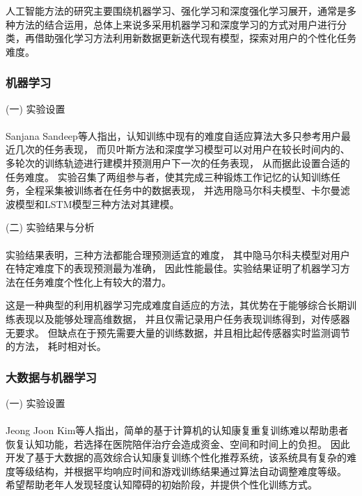 \documentclass[12pt]{article}
\begin{document}
        人工智能方法的研究主要围绕机器学习、强化学习和深度强化学习展开，通常是多种方法的结合运用，总体上来说多采用机器学习和深度学习的方式对用户进行分类，再借助强化学习方法利用新数据更新迭代现有模型，探索对用户的个性化任务难度。
        \subsubsection{机器学习}
            (一) 实验设置\paragraph{}
            Sanjana Sandeep\cite{ref12}等人指出，认知训练中现有的难度自适应算法大多只参考用户最近几次的任务表现，
            而贝叶斯方法和深度学习模型可以对用户在较长时间内的、多轮次的训练轨迹进行建模并预测用户下一次的任务表现，
            从而据此设置合适的任务难度。
            实验召集了两组参与者，使其完成三种锻炼工作记忆的认知训练任务，全程采集被训练者在任务中的数据表现，
            并选用隐马尔科夫模型、卡尔曼滤波模型和LSTM模型三种方法对其建模。

            (二) 实验结果与分析\paragraph{}
            实验结果表明，三种方法都能合理预测适宜的难度，
            其中隐马尔科夫模型对用户在特定难度下的表现预测最为准确，
            因此性能最佳。实验结果证明了机器学习方法在任务难度个性化上有较大的潜力。

            这是一种典型的利用机器学习完成难度自适应的方法，其优势在于能够综合长期训练表现以及能够处理高维数据，
            并且仅需记录用户任务表现训练得到，对传感器无要求。
            但缺点在于预先需要大量的训练数据，并且相比起传感器实时监测调节的方法，
            耗时相对长。

            \subsubsection{大数据与机器学习}
            (一) 实验设置\paragraph{}
            Jeong Joon Kim\cite{ref13}等人指出，简单的基于计算机的认知康复重复训练难以帮助患者恢复认知功能，若选择在医院陪伴治疗会造成资金、空间和时间上的负担。
            因此开发了基于大数据的高效综合认知康复训练个性化推荐系统，该系统具有复杂的难度等级结构，并根据平均响应时间和游戏训练结果通过算法自动调整难度等级。
            希望帮助老年人发现轻度认知障碍的初始阶段，并提供个性化训练方式。
\end{document}
